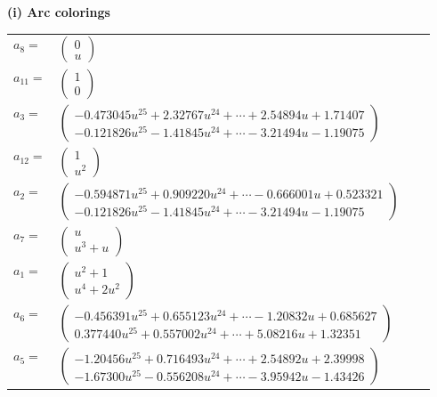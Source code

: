 \documentclass[1p]{elsarticle_modified}
\theoremstyle{definition}
\begin{document}
\flushleft \textbf{(i) Arc colorings}\\
\begin{tabular}{m{7pt} m{180pt} m{7pt} m{180pt} }
\flushright $a_{8}=$&$\begin{pmatrix}0\\u\end{pmatrix}$ \\
\flushright $a_{11}=$&$\begin{pmatrix}1\\0\end{pmatrix}$ \\
\flushright $a_{3}=$&$\begin{pmatrix}-0.473045 u^{25}+2.32767 u^{24}+\cdots+2.54894 u+1.71407\\-0.121826 u^{25}-1.41845 u^{24}+\cdots-3.21494 u-1.19075\end{pmatrix}$ \\
\flushright $a_{12}=$&$\begin{pmatrix}1\\u^2\end{pmatrix}$ \\
\flushright $a_{2}=$&$\begin{pmatrix}-0.594871 u^{25}+0.909220 u^{24}+\cdots-0.666001 u+0.523321\\-0.121826 u^{25}-1.41845 u^{24}+\cdots-3.21494 u-1.19075\end{pmatrix}$ \\
\flushright $a_{7}=$&$\begin{pmatrix}u\\u^3+u\end{pmatrix}$ \\
\flushright $a_{1}=$&$\begin{pmatrix}u^2+1\\u^4+2 u^2\end{pmatrix}$ \\
\flushright $a_{6}=$&$\begin{pmatrix}-0.456391 u^{25}+0.655123 u^{24}+\cdots-1.20832 u+0.685627\\0.377440 u^{25}+0.557002 u^{24}+\cdots+5.08216 u+1.32351\end{pmatrix}$ \\
\flushright $a_{5}=$&$\begin{pmatrix}-1.20456 u^{25}+0.716493 u^{24}+\cdots+2.54892 u+2.39998\\-1.67300 u^{25}-0.556208 u^{24}+\cdots-3.95942 u-1.43426\end{pmatrix}$ \\

\end{tabular}
\end{document}
